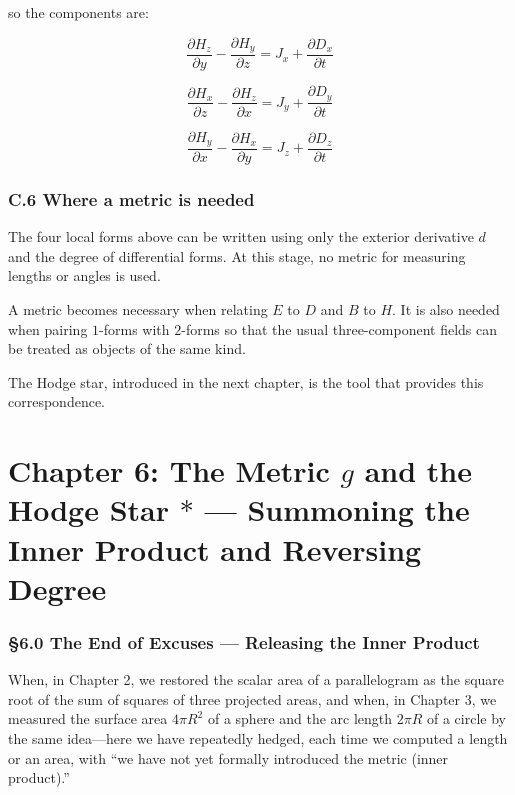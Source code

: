 \documentclass[a4paper,12pt,openany]{book}
\begin{document}
so the components are:

\[
\frac{\partial H_z}{\partial y}
-
\frac{\partial H_y}{\partial z}
=
J_x+\frac{\partial D_x}{\partial t}
\]

\[
\frac{\partial H_x}{\partial z}
-
\frac{\partial H_z}{\partial x}
=
J_y+\frac{\partial D_y}{\partial t}
\]

\[
\frac{\partial H_y}{\partial x}
-
\frac{\partial H_x}{\partial y}
=
J_z+\frac{\partial D_z}{\partial t}
\]

\hypertarget{c.6-where-a-metric-is-needed}{%
\subsection*{C.6 Where a metric is
needed}\label{c.6-where-a-metric-is-needed}}

The four local forms above can be written using only the exterior
derivative \(d\) and the degree of differential forms. At this stage, no
metric for measuring lengths or angles is used.

A metric becomes necessary when relating \(E\) to \(D\) and \(B\) to
\(H\). It is also needed when pairing \(1\)-forms with \(2\)-forms so
that the usual three-component fields can be treated as objects of the
same kind.

The Hodge star, introduced in the next chapter, is the tool that
provides this correspondence.

\newpage

\hypertarget{chapter-6-the-metric-g-and-the-hodge-star-ast-summoning-the-inner-product-and-reversing-degree}{%
\chapter{\texorpdfstring{Chapter 6: The Metric \(g\) and the Hodge Star
\(\ast\) — Summoning the Inner Product and Reversing
Degree}{Chapter 6: The Metric g and the Hodge Star \textbackslash ast — Summoning the Inner Product and Reversing Degree}}\label{chapter-6-the-metric-g-and-the-hodge-star-ast-summoning-the-inner-product-and-reversing-degree}}

\hypertarget{the-end-of-excuses-releasing-the-inner-product}{%
\subsection{§6.0 The End of Excuses — Releasing the Inner
Product}\label{the-end-of-excuses-releasing-the-inner-product}}

When, in Chapter 2, we restored the scalar area of a parallelogram as
the square root of the sum of squares of three projected areas, and
when, in Chapter 3, we measured the surface area \(4\pi R^2\) of a
sphere and the arc length \(2\pi R\) of a circle by the same idea—here
we have repeatedly hedged, each time we computed a length or an area,
with ``we have not yet formally introduced the metric (inner product).''
\end{document}
